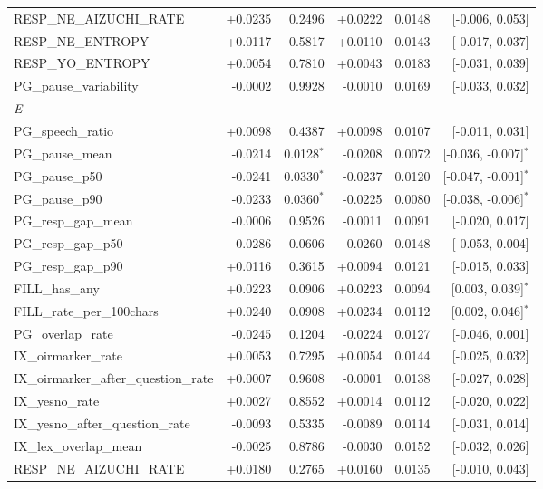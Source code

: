 \begin{longtable}{lrrrrr}
\quad RESP\_NE\_AIZUCHI\_RATE & +0.0235 & 0.2496 & +0.0222 & 0.0148 & [-0.006, 0.053] \\
\quad RESP\_NE\_ENTROPY & +0.0117 & 0.5817 & +0.0110 & 0.0143 & [-0.017, 0.037] \\
\quad RESP\_YO\_ENTROPY & +0.0054 & 0.7810 & +0.0043 & 0.0183 & [-0.031, 0.039] \\
\quad PG\_pause\_variability & -0.0002 & 0.9928 & -0.0010 & 0.0169 & [-0.033, 0.032] \\
\midrule
\multicolumn{6}{l}{\textit{E}} \\
\quad PG\_speech\_ratio & +0.0098 & 0.4387 & +0.0098 & 0.0107 & [-0.011, 0.031] \\
\quad PG\_pause\_mean & -0.0214 & 0.0128$^{*}$ & -0.0208 & 0.0072 & [-0.036, -0.007]$^{*}$ \\
\quad PG\_pause\_p50 & -0.0241 & 0.0330$^{*}$ & -0.0237 & 0.0120 & [-0.047, -0.001]$^{*}$ \\
\quad PG\_pause\_p90 & -0.0233 & 0.0360$^{*}$ & -0.0225 & 0.0080 & [-0.038, -0.006]$^{*}$ \\
\quad PG\_resp\_gap\_mean & -0.0006 & 0.9526 & -0.0011 & 0.0091 & [-0.020, 0.017] \\
\quad PG\_resp\_gap\_p50 & -0.0286 & 0.0606 & -0.0260 & 0.0148 & [-0.053, 0.004] \\
\quad PG\_resp\_gap\_p90 & +0.0116 & 0.3615 & +0.0094 & 0.0121 & [-0.015, 0.033] \\
\quad FILL\_has\_any & +0.0223 & 0.0906 & +0.0223 & 0.0094 & [0.003, 0.039]$^{*}$ \\
\quad FILL\_rate\_per\_100chars & +0.0240 & 0.0908 & +0.0234 & 0.0112 & [0.002, 0.046]$^{*}$ \\
\quad PG\_overlap\_rate & -0.0245 & 0.1204 & -0.0224 & 0.0127 & [-0.046, 0.001] \\
\quad IX\_oirmarker\_rate & +0.0053 & 0.7295 & +0.0054 & 0.0144 & [-0.025, 0.032] \\
\quad IX\_oirmarker\_after\_question\_rate & +0.0007 & 0.9608 & -0.0001 & 0.0138 & [-0.027, 0.028] \\
\quad IX\_yesno\_rate & +0.0027 & 0.8552 & +0.0014 & 0.0112 & [-0.020, 0.022] \\
\quad IX\_yesno\_after\_question\_rate & -0.0093 & 0.5335 & -0.0089 & 0.0114 & [-0.031, 0.014] \\
\quad IX\_lex\_overlap\_mean & -0.0025 & 0.8786 & -0.0030 & 0.0152 & [-0.032, 0.026] \\
\quad RESP\_NE\_AIZUCHI\_RATE & +0.0180 & 0.2765 & +0.0160 & 0.0135 & [-0.010, 0.043] \\

\end{longtable}
